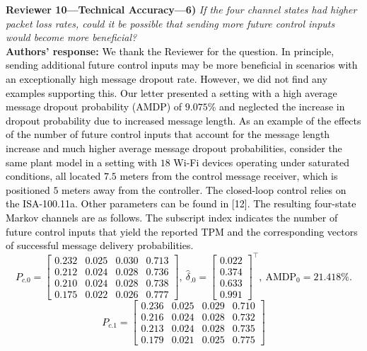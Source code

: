 \textbf{Reviewer 10---Technical Accuracy---6)}\textit{ %
If the four channel states had higher packet loss rates, could it be possible that sending more future control inputs would become more beneficial?}\\[2mm]
\textbf{Authors' response:} \textcolor{black}{We thank the Reviewer for the question. In principle, sending additional future control inputs may be more beneficial in scenarios with an exceptionally high message dropout rate. However, we did not find any examples supporting this. Our letter presented a setting with a high average message dropout probability (AMDP) of $9.075$\% and neglected the increase in dropout probability due to increased message length. As an example of the effects of the number of future control inputs that account for the message length increase and much higher average message dropout probabilities, consider the same plant model in a setting with $18$ Wi-Fi devices operating under saturated conditions, all located $7.5$ meters from the control message receiver, which is positioned $5$ meters away from the controller. The closed-loop control relies on the ISA-100.11a. Other parameters can be found in [12]. The resulting four-state Markov channels are as follows. The subscript index indicates the number of future control inputs that yield the reported TPM and the corresponding vectors of successful message delivery probabilities.
\begin{equation*}
    P_{c.0} = 
\begin{bmatrix}
0.232 & 0.025 & 0.030 & 0.713 \\
0.212 & 0.024 & 0.028 & 0.736 \\
0.210 & 0.024 & 0.028 & 0.738 \\
0.175 & 0.022 & 0.026 & 0.777
\end{bmatrix},~
\hat{\delta}_{.0} = 
\begin{bmatrix}
0.022 \\ 0.374 \\ 0.633 \\ 0.991
\end{bmatrix}^{\top},~\text{AMDP}_{0} = 21.418\%.
\end{equation*}
\begin{equation*}
    P_{c.1} = 
\begin{bmatrix}
0.236 & 0.025 & 0.029 & 0.710 \\
0.216 & 0.024 & 0.028 & 0.732 \\
0.213 & 0.024 & 0.028 & 0.735 \\
0.179 & 0.021 & 0.025 & 0.775

\end{bmatrix}
\end{equation*}}
